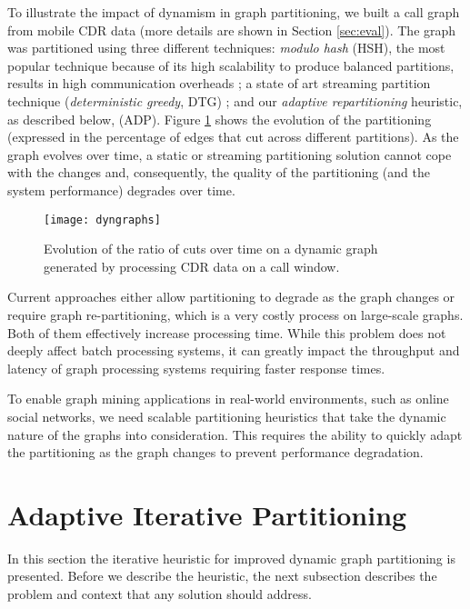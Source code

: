 \documentclass{sig-alternate-10pt}
\begin{document}
To illustrate the impact of dynamism in graph partitioning, we built a call graph from mobile CDR data (more details are shown in Section \ref{sec:eval}). The graph was partitioned using three different techniques: \emph{modulo hash} (HSH), the most popular technique because of its high scalability to produce balanced partitions, results in high communication overheads \cite{Mizan}; a state of art streaming partition technique (\emph{deterministic greedy}, DTG) \cite{Stanton2012}; and our \emph{adaptive repartitioning} heuristic, as described below, (ADP). Figure \ref{fig:2-dyngraphs} shows  the evolution of the partitioning (expressed in the percentage of edges that cut across different partitions). As the graph evolves over time, a static or streaming partitioning solution cannot cope with the changes and, consequently,
the quality of the partitioning (and the system performance) degrades over time. 

\begin{figure}
  \centering
    \texttt{[image: dyngraphs]}
       \vspace{-10pt}
  \caption{ Evolution of the ratio of cuts over time on a dynamic graph generated by processing CDR data on a call
  window. }
         \vspace{-10pt}
  \label{fig:2-dyngraphs}
\end{figure}

Current approaches either allow partitioning to degrade as the graph changes or require graph re-partitioning, which is a very costly process on large-scale graphs. Both of them effectively increase processing time. While this problem does not deeply affect batch processing systems, it can greatly impact the throughput and latency of graph processing systems requiring faster response times.

To enable graph mining applications in real-world environments,
such as online social networks, we need scalable partitioning heuristics that
take the dynamic nature of the graphs into consideration. This
requires the ability to quickly adapt the partitioning as the
graph changes to prevent performance degradation.


\section{Adaptive Iterative Partitioning}
\label{sec:aip}

In this section the iterative heuristic for improved dynamic graph partitioning is presented. Before we describe the heuristic, the next subsection describes the problem and context that any solution should address.
\end{document}
